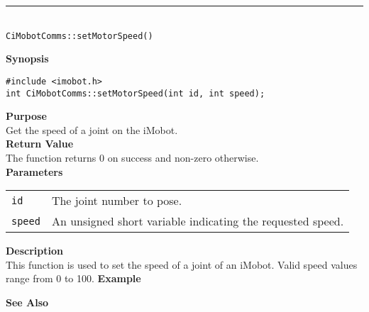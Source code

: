 \noindent
\vspace{5pt}
\rule{4.5in}{0.015in}\\
\noindent
{\LARGE \texttt{CiMobotComms::setMotorSpeed()}}\\
{}

\noindent
{\bf Synopsis}\\
\begin{verbatim}
#include <imobot.h>
int CiMobotComms::setMotorSpeed(int id, int speed);
\end{verbatim}

\noindent
{\bf Purpose}\\
Get the speed of a joint on the iMobot.\\

\noindent
{\bf Return Value}\\
The function returns 0 on success and non-zero otherwise.\\

\noindent
{\bf Parameters}
\vspace{-0.1in}
\begin{description}
\item               
\begin{tabular}{p{10 mm}p{145 mm}}
\texttt{id} & The joint number to pose. \\
\texttt{speed} & An unsigned short variable indicating the requested speed.
\end{tabular}
\end{description}

\noindent
{\bf Description}\\
This function is used to set the speed of a joint of an iMobot. Valid speed
values range from 0 to 100.
\noindent
{\bf Example}\\
\noindent

\noindent
{\bf See Also}\\

